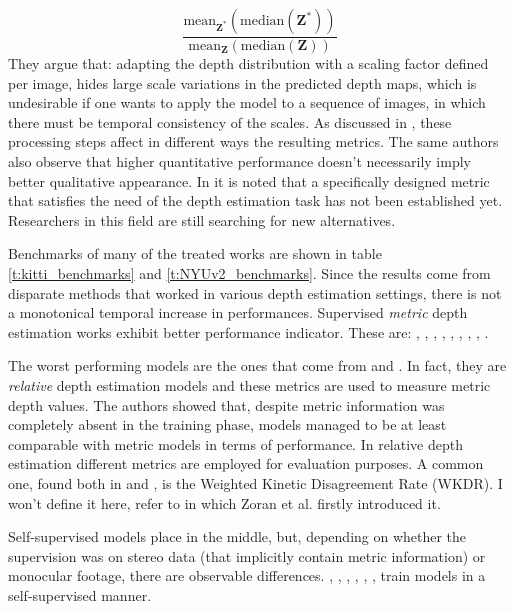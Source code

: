 \[
	\frac{
		\text{mean}_{\mathbf{Z}^{*}} (\text{median} ( \mathbf{Z}^{*}))
	}{
		\text{mean}_{\mathbf{Z}} (\text{median} ( \mathbf{Z}))
	}
\]
They argue that: adapting the depth distribution with a scaling factor defined per image, hides large scale variations in the predicted depth maps, which is undesirable if one wants to apply the model to a sequence of images, in which there must be temporal consistency of the scales.
As discussed in \cite{evalStudy}, these processing steps affect in different ways the resulting metrics.
The same authors also observe that higher quantitative performance doesn't necessarily imply better qualitative appearance.
In \cite{monocular2024} it is noted that a specifically designed metric that satisfies the need of the depth estimation task has not been established yet.
Researchers in this field are still searching for new alternatives.

\vfill

Benchmarks of many of the treated works are shown in table \ref{t:kitti_benchmarks} and \ref{t:NYUv2_benchmarks}.
Since the results come from disparate methods that worked in various depth estimation settings, there is not a monotonical temporal increase in performances.
Supervised \textit{metric} depth estimation works exhibit better performance indicator.
These are: \cite{Eigen}, \cite{Eigen2}, \cite{depth_as_classification}, \cite{ordinal_regression}, \cite{denseViT}, \cite{AdaBins}, \cite{Laina}, \cite{LocalBins}, \cite{ZoeDepth}.

The worst performing models are the ones that come from \cite{DIW} and \cite{ReDWeb}.
In fact, they are \textit{relative} depth estimation models and these metrics are used to measure metric depth values.
The authors showed that, despite metric information was completely absent in the training phase, models managed to be at least comparable with metric models in terms of performance.
In relative depth estimation different metrics are employed for evaluation purposes.
A common one, found both in \cite{DIW} and \cite{ReDWeb}, is the Weighted Kinetic Disagreement Rate (WKDR).
I won't define it here, refer to \cite{Zoran} in which Zoran et al. firstly introduced it.

Self-supervised models place in the middle, but, depending on whether the supervision was on stereo data (that implicitly contain metric information) or monocular footage, there are observable differences.
\cite{Garg}, \cite{MonoDepth}, \cite{MonoDepth2}, \cite{struct2depth}, \cite{vid2depth}, \cite{FeatDepth}, \cite{SfMLearner} train models in a self-supervised manner.

